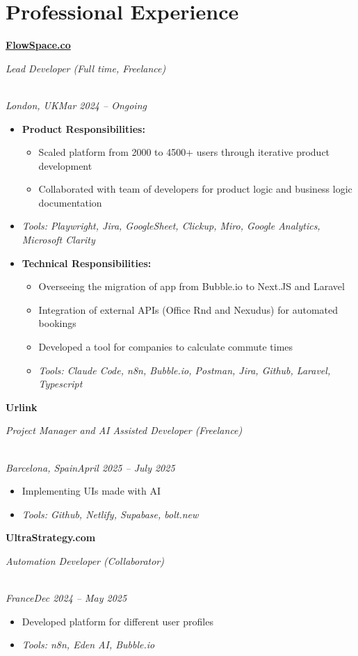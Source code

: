 \documentclass[a4paper,10pt]{article}
\newcommand{\role}[4]{\vspace{3pt}\noindent\hspace{0.6em}\parbox[t]{0.38\textwidth}{\raggedright\textbf{#1}}\hfill\parbox[t]{0.58\textwidth}{\raggedleft\textit{#2}}\\{\textit{#3}\hfill\textit{#4}}\vspace{1pt}}
\begin{document}
\section{Professional Experience}
\role{\href{https://flowspace.co}{FlowSpace.co}}{Lead Developer (Full time, Freelance)}{London, UK}{Mar 2024 -- Ongoing}
\begin{itemize}
\item \textbf{Product Responsibilities:}
\begin{itemize}[label=--]
\item Scaled platform from 2000 to 4500+ users through iterative product development
\item Collaborated with team of developers for product logic and business logic documentation
\end{itemize}
\item \textit{Tools: Playwright, Jira, GoogleSheet, Clickup, Miro, Google Analytics, Microsoft Clarity}
\item \textbf{Technical Responsibilities:}
\begin{itemize}[label=--]
\item Overseeing the migration of app from Bubble.io to Next.JS and Laravel
\item Integration of external APIs (Office Rnd and Nexudus) for automated bookings
\item Developed a tool for companies to calculate commute times
\item \textit{Tools: Claude Code, n8n, Bubble.io, Postman, Jira, Github, Laravel, Typescript}
\end{itemize}
\end{itemize}

\role{Urlink}{Project Manager and AI Assisted Developer (Freelance)}{Barcelona, Spain}{April 2025 -- July 2025}
\begin{itemize}
\item Implementing UIs made with AI
\item \textit{Tools: Github, Netlify, Supabase, bolt.new}
\end{itemize}

\role{UltraStrategy.com}{Automation Developer (Collaborator)}{France}{Dec 2024 -- May 2025}
\begin{itemize}
\item Developed platform for different user profiles
\item \textit{Tools: n8n, Eden AI, Bubble.io}
\end{itemize}
\end{document}
